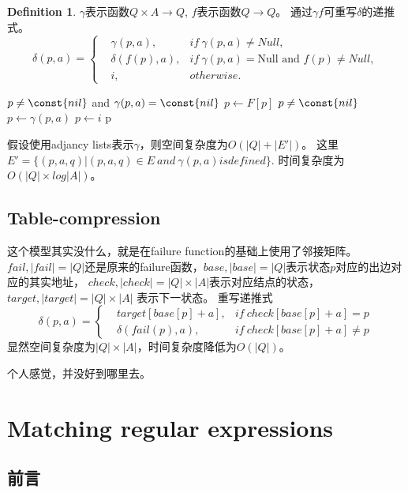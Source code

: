 \documentclass[UTF8]{ctexart}
\theoremstyle{definition}
\newtheorem{defn}[thm]{Definition}
\theoremstyle{remark}
\numberwithin{equation}{subsection}
\begin{document}
	\begin{defn}
		$\gamma$表示函数$Q \times A \rightarrow Q$, $f$表示函数$Q \rightarrow Q$。
		通过$\gamma f$可重写$\delta$的递推式。
		\[
			\delta(p,a) =
			\left\{
			\begin{aligned}
				&\gamma(p, a), 		&if\ \gamma(p, a) \neq Null,	              \\
				&\delta(f(p), a), 	&if\ \gamma(p, a) = \text{Null and } f(p) \neq Null,	\\
				&i,					&otherwise.
			\end{aligned}
			\right .
		\]
	\end{defn}
	\begin{codebox}
		\li	\While $p \neq \const{nil}$ and $\gamma(p,a) = \const{nil}$
		\li	\Do
				$p \gets F[p]$
			\End
		\li \If $p \neq \const{nil}$
		\li		\Then $p \gets \gamma(p,a)$
		\li		\Else $p \gets i$
				\End
		\li	\Return p
	\end{codebox}
	假设使用adjancy lists表示$\gamma$，则空间复杂度为$O(|Q| + |E'|)$。
	这里$E' = \{(p,a,q) | (p,a,q) \in E \ and\ \gamma(p,a) is defined \}$.
	时间复杂度为$O(|Q| \times log |A|)$。
	
\subsection{Table-compression}

	这个模型其实没什么，就是在failure function的基础上使用了邻接矩阵。
	$fail, |fail|=|Q|$还是原来的failure函数，$base, |base|=|Q|$表示状态$p$对应的出边对应的其实地址，
	$check, |check|=|Q|\times|A|$表示对应结点的状态，$target, |target|=|Q|\times|A|$ 表示下一状态。
	重写递推式
	\[
		\delta(p, a) =
		\left\{
		\begin{aligned}
			&target[base[p]+a], 	&if\ check[base[p]+a] = p		\\
			&\delta(fail(p), a),	&if\ check[base[p]+a] \neq p
		\end{aligned}
		\right .
	\]
	显然空间复杂度为$|Q| \times |A|$，时间复杂度降低为$O(|Q|)$。
	
	个人感觉，并没好到哪里去。
	
\section{Matching regular expressions}

\subsection{前言}
\end{document}
